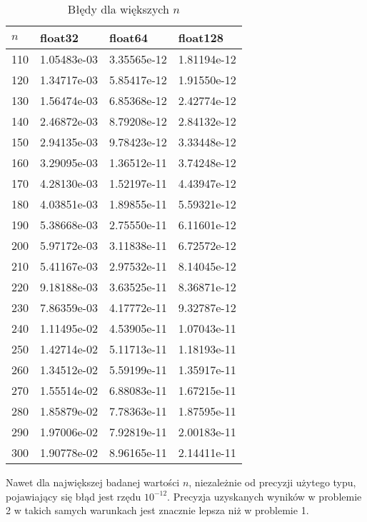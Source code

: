 \documentclass{article}
\begin{document}
\begin{table}[H]
\centering
\begin{tabular}{|l|l|l|l|}
\hline
$n$ & float32 & float64 & float128 \\ \hline
110 & 1.05483e-03 & 3.35565e-12 & 1.81194e-12 \\ \hline
120 & 1.34717e-03 & 5.85417e-12 & 1.91550e-12 \\ \hline
130 & 1.56474e-03 & 6.85368e-12 & 2.42774e-12 \\ \hline
140 & 2.46872e-03 & 8.79208e-12 & 2.84132e-12 \\ \hline
150 & 2.94135e-03 & 9.78423e-12 & 3.33448e-12 \\ \hline
160 & 3.29095e-03 & 1.36512e-11 & 3.74248e-12 \\ \hline
170 & 4.28130e-03 & 1.52197e-11 & 4.43947e-12 \\ \hline
180 & 4.03851e-03 & 1.89855e-11 & 5.59321e-12 \\ \hline
190 & 5.38668e-03 & 2.75550e-11 & 6.11601e-12 \\ \hline
200 & 5.97172e-03 & 3.11838e-11 & 6.72572e-12 \\ \hline
210 & 5.41167e-03 & 2.97532e-11 & 8.14045e-12 \\ \hline
220 & 9.18188e-03 & 3.63525e-11 & 8.36871e-12 \\ \hline
230 & 7.86359e-03 & 4.17772e-11 & 9.32787e-12 \\ \hline
240 & 1.11495e-02 & 4.53905e-11 & 1.07043e-11 \\ \hline
250 & 1.42714e-02 & 5.11713e-11 & 1.18193e-11 \\ \hline
260 & 1.34512e-02 & 5.59199e-11 & 1.35917e-11 \\ \hline
270 & 1.55514e-02 & 6.88083e-11 & 1.67215e-11 \\ \hline
280 & 1.85879e-02 & 7.78363e-11 & 1.87595e-11 \\ \hline
290 & 1.97006e-02 & 7.92819e-11 & 2.00183e-11 \\ \hline
300 & 1.90778e-02 & 8.96165e-11 & 2.14411e-11 \\ \hline
\end{tabular}
\caption{Błędy dla większych $n$}
\end{table}

Nawet dla największej badanej wartości $n$, niezależnie od precyzji użytego typu, pojawiający się błąd jest
rzędu $10^{-12}$. Precyzja uzyskanych wyników w problemie 2 w takich samych warunkach jest znacznie lepsza niż w 
problemie 1.
\end{document}
